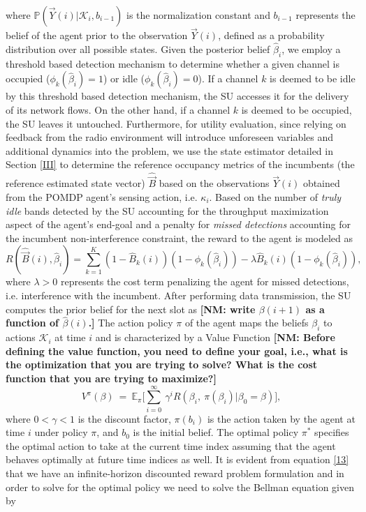 \documentclass[10pt,twocolumn]{IEEEtran}
\newcommand{\nm}[1]{{\color{blue}\bf{[NM: #1]}}}
\begin{document}
where $\mathbb{P}(\vec{Y}(i)|\mathcal{K}_i,b_{i-1})$ is the normalization constant and $b_{i-1}$ represents the belief of the agent prior to the observation $\vec{Y}(i)$, defined as a probability distribution over all possible states.
Given the posterior belief $\hat{\beta}_i$, we employ a threshold based detection mechanism to determine whether a given channel is occupied ($\phi_k(\hat{\beta}_i) = 1$) or idle ($\phi_k(\hat{\beta}_i) = 0$). If a channel $k$ is deemed to be idle by this threshold based detection mechanism, the SU accesses it for the delivery of its network flows. On the other hand, if a channel $k$ is deemed to be occupied, the SU leaves it untouched. Furthermore, for utility evaluation, since relying on feedback from the radio environment will introduce unforeseen variables and additional dynamics into the problem, we use the state estimator detailed in Section \ref{III} to determine the reference occupancy metrics of the incumbents (the reference estimated state vector) $\hat{\vec{B}}$ based on the observations $\vec{Y}(i)$ obtained from the POMDP agent's sensing action, i.e. $\kappa_i$. Based on the number of \emph{truly idle} bands detected by the SU accounting for the throughput maximization aspect of the agent's end-goal and a penalty for \emph{missed detections} accounting for the incumbent non-interference constraint, the reward to the agent is modeled as
\begin{equation}\label{12}
    R(\hat{\vec{B}}(i), \hat{\beta}_i) = \sum_{k=1}^{K}(1 - \hat{B}_k(i))(1-\phi_k(\hat{\beta}_{i})) - \lambda \hat{B}_k(i)(1 - \phi_k(\hat{\beta}_i)),
\end{equation}
where $\lambda > 0$ represents the cost term penalizing the agent for missed detections, i.e. interference with the incumbent. After performing data transmission, the SU computes the prior belief for the next slot as
\nm{write $\beta(i+1)$ as a function of $\hat\beta(i)$.}
The action policy $\pi$ of the agent maps the beliefs $\beta_i$ to actions $\mathcal{K}_i$ at time $i$ and is characterized by a Value Function
\nm{Before defining the value function, you need to define your goal, i.e., what is the optimization that you are trying to solve? What is the cost function that you are trying to maximize?}
\begin{equation}\label{13}
V^{\pi}(\beta)\ =\ \mathbb{E}_{\pi}\Big[\sum_{i=0}^{\infty}\ \gamma^i R(\beta_i,\ \pi(\beta_i)|\beta_0=\beta)\Big],
\end{equation}
where $0 < \gamma < 1$ is the discount factor, $\pi(b_i)$ is the action taken by the agent at time $i$ under policy $\pi$, and $b_0$ is the initial belief. The optimal policy $\pi^*$ specifies the optimal action to take at the current time index assuming that the agent behaves optimally at future time indices as well. It is evident from equation \eqref{13} that we have an infinite-horizon discounted reward problem formulation and in order to solve for the optimal policy we need to solve the Bellman equation given by
\end{document}
